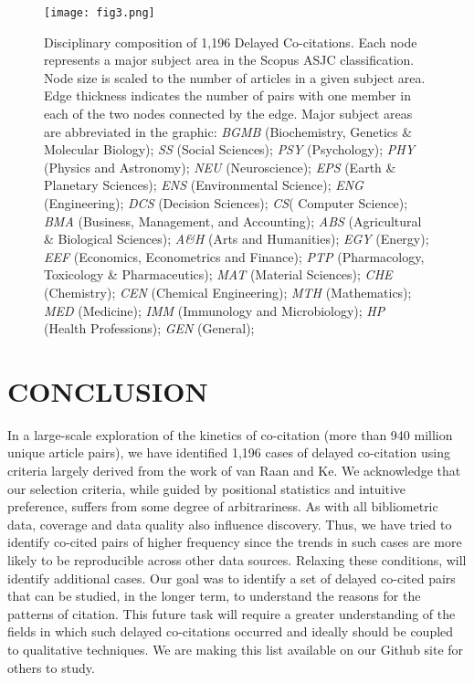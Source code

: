 \documentclass[utf8]{frontiersSCNS}
\begin{document}
\begin{figure}[h!]
\begin{center}
\texttt{[image: fig3.png]}%
\end{center}
\caption{Disciplinary composition of 1,196 Delayed Co-citations. Each node represents a major subject area in the Scopus ASJC classification. Node size is scaled to the number of articles in a given subject area. Edge thickness indicates the number of pairs with one member in each of the two nodes connected by the edge. Major subject areas are abbreviated in the graphic:
\emph{BGMB} (Biochemistry, Genetics \& Molecular Biology);
\emph{SS} (Social Sciences);
\emph{PSY} (Psychology);
\emph{PHY} (Physics and Astronomy);
\emph{NEU} (Neuroscience);
\emph{EPS} (Earth \& Planetary Sciences);
\emph{ENS} (Environmental Science);
\emph{ENG} (Engineering);
\emph{DCS} (Decision Sciences);
\emph{CS}( Computer Science);
\emph{BMA} (Business, Management, and Accounting);
\emph{ABS} (Agricultural \& Biological Sciences); 
\emph{A\&H} (Arts and Humanities);
\emph{EGY} (Energy);
\emph{EEF} (Economics, Econometrics and Finance);
\emph{PTP} (Pharmacology, Toxicology \& Pharmaceutics);
\emph{MAT} (Material Sciences);
\emph{CHE} (Chemistry);
\emph{CEN} (Chemical Engineering);
\emph{MTH} (Mathematics);
\emph{MED} (Medicine);
\emph{IMM} (Immunology and Microbiology);
\emph{HP} (Health Professions);
\emph{GEN} (General);}
\label{fig:fig3}
\end{figure}

\clearpage
 
\section{CONCLUSION} In a large-scale exploration of the kinetics of co-citation (more than 940 million unique article pairs), we have identified 1,196 cases of delayed co-citation using criteria largely derived from the work of van Raan and Ke. We acknowledge that our selection criteria, while guided by positional statistics and intuitive preference, suffers from some degree of arbitrariness.  As with all bibliometric data, coverage and data quality also influence discovery. Thus, we have tried to identify co-cited pairs of higher frequency since the trends in such cases are more likely to be reproducible across other data sources. Relaxing these conditions, will identify additional cases. Our goal was to identify a set of delayed co-cited pairs that can be studied, in the longer term, to understand the reasons for the patterns of citation. This future task will require a greater understanding of the fields in which such delayed co-citations occurred and ideally should be coupled to qualitative techniques. We are making this list available on our Github site for others to study. 
\end{document}
